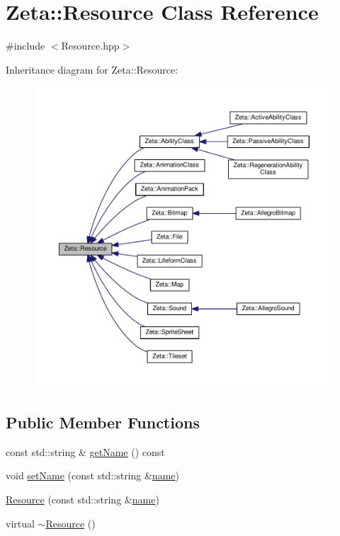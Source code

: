 \hypertarget{classZeta_1_1Resource}{\section{Zeta\+:\+:Resource Class Reference}
\label{classZeta_1_1Resource}
}


{\ttfamily \#include $<$Resource.\+hpp$>$}



Inheritance diagram for Zeta\+:\+:Resource\+:\nopagebreak
\begin{figure}[H]
\begin{center}
\leavevmode
\includegraphics[width=350pt]{classZeta_1_1Resource__inherit__graph}
\end{center}
\end{figure}
\subsection*{Public Member Functions}
\begin{DoxyCompactItemize}
\item 
const std\+::string \& \hyperlink{classZeta_1_1Resource_a04a886f7e400bad89a110fdedd9bd198}{get\+Name} () const 
\item 
void \hyperlink{classZeta_1_1Resource_a1e6846de6d1d22b8a1bd8d7c8bf1ea21}{set\+Name} (const std\+::string \&\hyperlink{classZeta_1_1Resource_a44c5721216f4beb31c0b3d2ef2aecf1d}{name})
\item 
\hyperlink{classZeta_1_1Resource_a714f0e0360cc94a81974c044963c3f59}{Resource} (const std\+::string \&\hyperlink{classZeta_1_1Resource_a44c5721216f4beb31c0b3d2ef2aecf1d}{name})
\item 
virtual \hyperlink{classZeta_1_1Resource_a733f525566dcde3fe52576f40079dbbc}{$\sim$\+Resource} ()
\end{DoxyCompactItemize}

